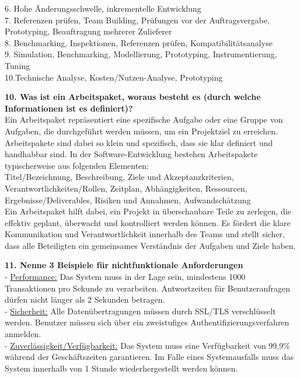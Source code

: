 \documentclass{article}
\begin{document}
6. Hohe Änderungsschwelle, inkrementelle Entwicklung \\
7. Referenzen prüfen, Team Building, Prüfungen vor der Auftragsvergabe, Prototyping, Beauftragung mehrerer Zulieferer \\
8. Benchmarking, Inspektionen, Referenzen prüfen, Kompatibilitätsanalyse \\
9. Simulation, Benchmarking, Modellierung, Prototyping, Instrumentierung, Tuning \\
10.Technische Analyse, Kosten/Nutzen-Analyse, Prototyping \\
\textbf{10. Was ist ein Arbeitspaket, woraus besteht es (durch welche Informationen ist es definiert)?}\\
Ein Arbeitspaket repräsentiert eine spezifische Aufgabe oder eine Gruppe von Aufgaben, die durchgeführt werden müssen, um ein Projektziel zu erreichen. Arbeitspakete sind dabei so klein und spezifisch, dass sie klar definiert und handhabbar sind. In der Software-Entwicklung bestehen Arbeitspakete typischerweise aus folgenden Elementen:\\
Titel/Bezeichnung, Beschreibung, Ziele und Akzeptanzkriterien, Verantwortlichkeiten/Rollen, Zeitplan, Abhängigkeiten, Ressourcen, Ergebnisse/Deliverables, Risiken und Annahmen, Aufwandschätzung \\
Ein Arbeitspaket hilft dabei, ein Projekt in überschaubare Teile zu zerlegen, die effektiv geplant, überwacht und kontrolliert werden können. Es fördert die klare Kommunikation und Verantwortlichkeit innerhalb des Teams und stellt sicher, dass alle Beteiligten ein gemeinsames Verständnis der Aufgaben und Ziele haben.\\
\textbf{11. Nenne 3 Beispiele für nichtfunktionale Anforderungen}\\
- \underline{Performance:} Das System muss in der Lage sein, mindestens 1000 Transaktionen pro Sekunde zu verarbeiten. Antwortzeiten für Benutzeranfragen dürfen nicht länger als 2 Sekunden betragen.\\
- \underline{Sicherheit:} Alle Datenübertragungen müssen durch SSL/TLS verschlüsselt werden. Benutzer müssen sich über ein zweistufiges Authentifizierungsverfahren anmelden.\\
- \underline{Zuverlässigkeit/Verfügbarkeit:} Das System muss eine Verfügbarkeit von 99,9\% während der Geschäftszeiten garantieren. Im Falle eines Systemausfalls muss das System innerhalb von 1 Stunde wiederhergestellt werden können.\\
\end{document}
